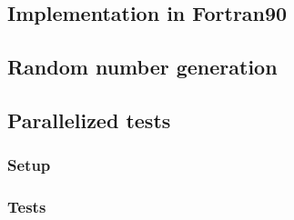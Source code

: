 \subsection*{Implementation in Fortran90}
\subsection*{Random number generation}
\subsection*{Parallelized tests}
\subsubsection*{Setup}
\subsubsection*{Tests}